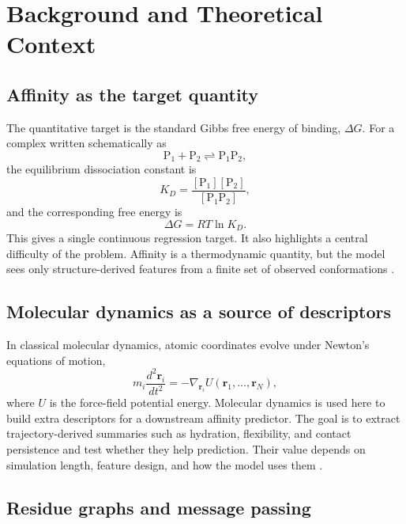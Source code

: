\chapter{Background and Theoretical Context}
\label{ch:theory}

\section{Affinity as the target quantity}

The quantitative target is the standard Gibbs free energy of binding, $\Delta G$. For a complex written schematically as
\begin{equation}
\mathrm{P}_1 + \mathrm{P}_2 \rightleftharpoons \mathrm{P}_1\mathrm{P}_2,
\end{equation}
the equilibrium dissociation constant is
\begin{equation}
K_D = \frac{[\mathrm{P}_1][\mathrm{P}_2]}{[\mathrm{P}_1\mathrm{P}_2]},
\end{equation}
and the corresponding free energy is
\begin{equation}
\Delta G = RT \ln K_D.
\end{equation}
This gives a single continuous regression target. It also highlights a central difficulty of the problem. Affinity is a thermodynamic quantity, but the model sees only structure-derived features from a finite set of observed conformations \citep{Liu2024PPBAffinity}.

\section{Molecular dynamics as a source of descriptors}

In classical molecular dynamics, atomic coordinates evolve under Newton's equations of motion,
\begin{equation}
m_i \frac{d^2 \mathbf{r}_i}{dt^2} = - \nabla_{\mathbf{r}_i} U(\mathbf{r}_1,\dots,\mathbf{r}_N),
\end{equation}
where $U$ is the force-field potential energy. Molecular dynamics is used here to build extra descriptors for a downstream affinity predictor. The goal is to extract trajectory-derived summaries such as hydration, flexibility, and contact persistence and test whether they help prediction. Their value depends on simulation length, feature design, and how the model uses them \citep{HenzlerWildman2007Dynamic}.

\section{Residue graphs and message passing}

